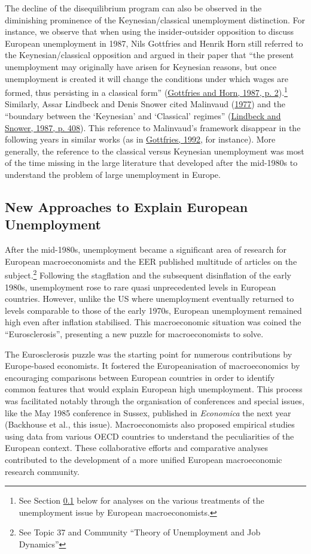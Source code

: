 \documentclass[
  12pt,
  onecolumn]{article}
\begin{document}
The decline of the disequilibrium program can also be observed in the
diminishing prominence of the Keynesian/classical unemployment
distinction. For instance, we observe that when using the
insider-outsider opposition to discuss European unemployment in 1987,
Nils Gottfries and Henrik Horn still referred to the Keynesian/classical
opposition and argued in their paper that ``the present unemployment may
originally have arisen for Keynesian reasons, but once unemployment is
created it will change the conditions under which wages are formed, thus
persisting in a classical form''
(\protect\hyperlink{ref-gottfries1987}{Gottfries and Horn, 1987, p.
2}).\footnote{See Section \ref{unemployment} below for analyses on the
  various treatments of the unemployment issue by European
  macroeconomists.} Similarly, Assar Lindbeck and Denis Snower cited
Malinvaud (\protect\hyperlink{ref-malinvaud1977}{1977}) and the
``boundary between the `Keynesian' and `Classical' regimes''
(\protect\hyperlink{ref-lindbeck1987a}{Lindbeck and Snower, 1987, p.
408}). This reference to Malinvaud's framework disappear in the
following years in similar works (as in
\protect\hyperlink{ref-gottfries1992}{Gottfries, 1992}, for instance).
More generally, the reference to the classical versus Keynesian
unemployment was most of the time missing in the large literature that
developed after the mid-1980s to understand the problem of large
unemployment in Europe.

\hypertarget{unemployment}{%
\subsection{New Approaches to Explain European
Unemployment}\label{unemployment}}

After the mid-1980s, unemployment became a significant area of research
for European macroeconomists and the EER published multitude of articles
on the subject.\footnote{See Topic 37 and Community ``Theory of
  Unemployment and Job Dynamics''} Following the stagflation and the
subsequent disinflation of the early 1980s, unemployment rose to rare
quasi unprecedented levels in European countries. However, unlike the US
where unemployment eventually returned to levels comparable to those of
the early 1970s, European unemployment remained high even after
inflation stabilised. This macroeconomic situation was coined the
``Eurosclerosis'', presenting a new puzzle for macroeconomists to solve.

The Eurosclerosis puzzle was the starting point for numerous
contributions by Europe-based economists. It fostered the
Europeanisation of macroeconomics by encouraging comparisons between
European countries in order to identify common features that would
explain European high unemployment. This process was facilitated notably
through the organisation of conferences and special issues, like the May
1985 conference in Sussex, published in \emph{Economica} the next year
(Backhouse et al., this issue). Macroeconomists also proposed empirical
studies using data from various OECD countries to understand the
peculiarities of the European context. These collaborative efforts and
comparative analyses contributed to the development of a more unified
European macroeconomic research community.
\end{document}
